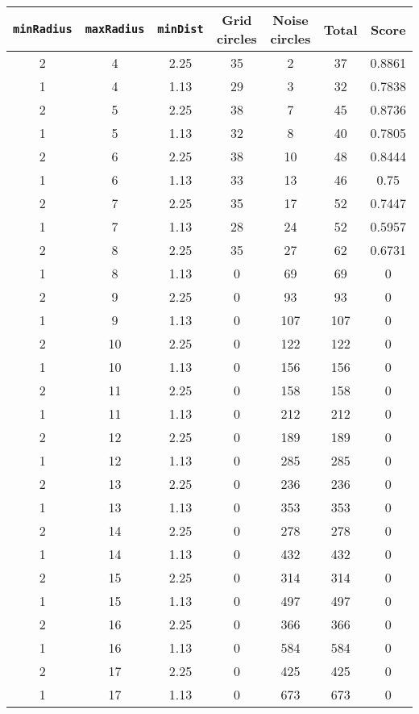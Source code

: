 \documentclass[letterpaper, 12pt]{article}
\begin{document}
\begin{longtable}{|c|c|c|c|c|c|c|}
\hline
\textbf{\texttt{minRadius}} & \textbf{\texttt{maxRadius}} & \textbf{\texttt{minDist}} & \textbf{Grid circles} & \textbf{Noise circles} & \textbf{Total} & \textbf{Score} \\
\hline
2 & 4 & 2.25 & 35 & 2 & 37 & 0.8861 \\
\hline
1 & 4 & 1.13 & 29 & 3 & 32 & 0.7838 \\
\hline
2 & 5 & 2.25 & 38 & 7 & 45 & 0.8736 \\
\hline
1 & 5 & 1.13 & 32 & 8 & 40 & 0.7805 \\
\hline
2 & 6 & 2.25 & 38 & 10 & 48 & 0.8444 \\
\hline
1 & 6 & 1.13 & 33 & 13 & 46 & 0.75 \\
\hline
2 & 7 & 2.25 & 35 & 17 & 52 & 0.7447 \\
\hline
1 & 7 & 1.13 & 28 & 24 & 52 & 0.5957 \\
\hline
2 & 8 & 2.25 & 35 & 27 & 62 & 0.6731 \\
\hline
1 & 8 & 1.13 & 0 & 69 & 69 & 0 \\
\hline
2 & 9 & 2.25 & 0 & 93 & 93 & 0 \\
\hline
1 & 9 & 1.13 & 0 & 107 & 107 & 0 \\
\hline
2 & 10 & 2.25 & 0 & 122 & 122 & 0 \\
\hline
1 & 10 & 1.13 & 0 & 156 & 156 & 0 \\
\hline
2 & 11 & 2.25 & 0 & 158 & 158 & 0 \\
\hline
1 & 11 & 1.13 & 0 & 212 & 212 & 0 \\
\hline
2 & 12 & 2.25 & 0 & 189 & 189 & 0 \\
\hline
1 & 12 & 1.13 & 0 & 285 & 285 & 0 \\
\hline
2 & 13 & 2.25 & 0 & 236 & 236 & 0 \\
\hline
1 & 13 & 1.13 & 0 & 353 & 353 & 0 \\
\hline
2 & 14 & 2.25 & 0 & 278 & 278 & 0 \\
\hline
1 & 14 & 1.13 & 0 & 432 & 432 & 0 \\
\hline
2 & 15 & 2.25 & 0 & 314 & 314 & 0 \\
\hline
1 & 15 & 1.13 & 0 & 497 & 497 & 0 \\
\hline
2 & 16 & 2.25 & 0 & 366 & 366 & 0 \\
\hline
1 & 16 & 1.13 & 0 & 584 & 584 & 0 \\
\hline
2 & 17 & 2.25 & 0 & 425 & 425 & 0 \\
\hline
1 & 17 & 1.13 & 0 & 673 & 673 & 0 \\

\end{longtable}
\end{document}
